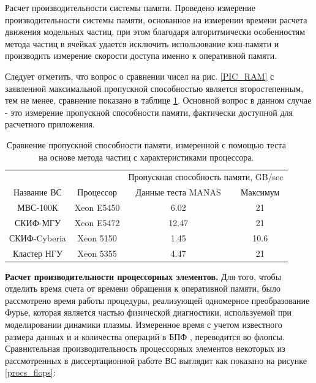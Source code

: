 {Расчет производительности системы памяти.}
Проведено измерение производительности системы памяти, основанное на измерении времени расчета движения модельных частиц, при этом благодаря алгоритмически особенностям метода частиц в ячейках удается исключить использование кэш-памяти и производить измерение скорости доступа именно к оперативной памяти.

Следует отметить, что вопрос о сравнении чисел на рис. \ref{PIC_RAM} с заявленной максимальной пропускной способностью 
является второстепенным, тем не менее, сравнение показано в таблице \ref{PIC_vs_PROC_RAM}. Основной вопрос в данном случае - это измерение пропускной способности памяти,  фактически доступной для расчетного приложения.

\begin{table}[ht]
	\caption{Сравнение пропускной способности памяти, измеренной с помощью теста на основе метода частиц с характеристиками процессора.}
	\label{PIC_vs_PROC_RAM}
	\begin{tabular}{|c|c|c|c|}
		\hline
		&            & \multicolumn{2}{|c|}{Пропускная способность памяти, GB/sec} \\ \cline{3-4}  	
		Название ВС  & Процессор  & Данные теста MANAS & Максимум \\ \hline
		МВС-100К     & Xeon E5450 &     6.02           & 21       \\ \hline 
		СКИФ-МГУ     & Xeon E5472 &     12.47          & 21       \\ \hline     
		СКИФ-Cyberia & Xeon 5150  &     1.45           & 10.6     \\ \hline
		Кластер НГУ  & Xeon 5355  &     4.47           & 21       \\ \hline
	\end{tabular}	
\end{table}
   

\textbf{Расчет производительности процессорных элементов.}
Для того, чтобы отделить время счета от времени обращения к оперативной памяти, было рассмотрено время работы процедуры,
реализующей одномерное преобразование Фурье, которая является частью физической диагностики, используемой при моделировании динамики плазмы. Измеренное время с учетом известного размера данных и и количества операций в БПФ \cite{FFT_OVS}, переводится во флопсы. Сравнительная производительность процессорных элементов некоторых из рассмотренных в диссертационной работе ВС выглядит как показано на рисунке  \ref{procs_flops}:

